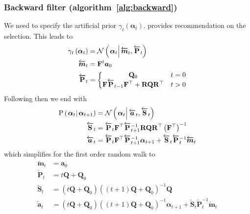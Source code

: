 \documentclass[9pt, notitlepage]{article}
\renewcommand{\vec}[1]{\bm{#1}}
\newcommand{\vecLarrow}[1]{\overleftarrow{\vec{#1}}}
\newcommand{\mat}[1]{\mathbf{#1}}
\newcommand{\matLarrow}[1]{\overleftarrow{\mat{#1}}}
\newcommand{\Lparen}[1]{\left( #1\right)}
\newcommand{\Cond}[2]{\left. #1 \vphantom{#2} \right\vert  #2}
\newcommand{\Prob}{\text{P}}
\newcommand{\optor}[2]{#1\Lparen{#2}}
\newcommand{\optorC}[3]{\optor{#1}{\Cond{#2}{#3}}}
\newcommand{\propC}[2]{\optorC{\Prob}{#1}{#2}}
\newcommand{\normalC}[3]{\optorC{\mathcal{N}}{#1}{#2,#3}}
\begin{document}
\subsubsection*{Backward filter (algorithm~\ref{alg:backward})}
We need to specify the artificial prior $\gamma_t\Lparen{\vec{\alpha}_t}$. \citet[page 69 and 70]{briers10} provides recommendation on the selection. This leads to%
%
\begin{equation}\begin{split}
	\gamma_t\Lparen{\vec{\alpha}_t} &=
		\normalC{\vec{\alpha}_t}{\vecLarrow{m}_t}{\matLarrow{P}_t} \\
%
	\vecLarrow{m}_t &= \mat{F}^t\vec{a}_0 \\
%
	\matLarrow{P}_t &= \left\{
		\begin{matrix} \mat{Q}_0 & t = 0 \\ \mat{F}\matLarrow{P}_{t - 1}\mat{F}^\top + 
		\mat{R}\mat{Q}\mat{R}^{\top} & t > 0   \end{matrix} \right.
\end{split}\end{equation}
%
Following \cite{fearnhead10} then we end with%
%
\begin{equation}\label{eqn:bwTransProp}\begin{split}
	\propC{\vec{\alpha}_t}{\vec{\alpha}_{t+1}} &=
	\normalC{\vec{\alpha}_t}{\vecLarrow{a}_t}{\matLarrow{S}_t} \\
%
	\matLarrow{S}_t &= \matLarrow{P}_t\mat{F}^\top\matLarrow{P}_{t + 1}^{-1}\mat{R}\mat{Q}\mat{R}^\top\Lparen{\mat{F}^\top}^{-1} \\
%
	\vecLarrow{a}_t &=
		\matLarrow{P}_t\mat{F}^\top\matLarrow{P}_{t + 1}^{-1}\vec{\alpha}_{t+1}
		+ \matLarrow{S}_t\matLarrow{P}_t^{-1} \vecLarrow{m}_t
\end{split}\end{equation}%
%
which simplifies for the first order random walk to%
%
\begin{equation}\begin{split}
	\vecLarrow{m}_t &= \vec{a}_0 \\
%
	\matLarrow{P}_t &= t\mat{Q} + \mat{Q}_0 \\
%
	\matLarrow{S}_t &=
		\Lparen{t\mat{Q} + \mat{Q}_0}
		\Lparen{(t+1)\mat{Q} + \mat{Q}_0}^{-1}\mat{Q} \\
%
	\vecLarrow{a}_t &=
		\Lparen{t\mat{Q} + \mat{Q}_0}
		\Lparen{(t+1)\mat{Q} + \mat{Q}_0}^{-1}\vec{\alpha}_{t+1}
		+ \matLarrow{S}_t\matLarrow{P}_t^{-1} \vecLarrow{m}_t
\end{split}\end{equation}%
\end{document}

